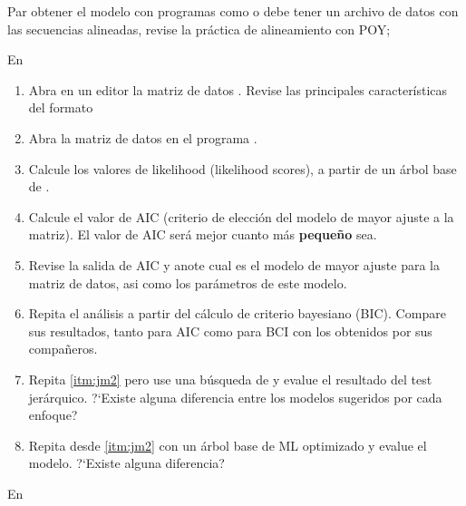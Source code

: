 Par obtener el modelo con programas como  o  debe tener un archivo de datos con las secuencias alineadas, revise la pr\'actica de alineamiento con POY; %



En 


\begin{enumerate}
	\item Abra en un editor la matriz de datos . Revise las principales caracter\'isticas del formato 

	\item Abra la matriz de datos en el programa .
	
	\item\label{itm:jm2} Calcule los valores de likelihood (likelihood scores), a partir de un \'arbol base de . 
	
	\item Calcule el valor de AIC (criterio de elecci\'on del modelo de mayor ajuste a la matriz). El valor de AIC ser\'a mejor cuanto m\'as \textbf{peque\~no} sea.
	
	\item Revise la salida de AIC y anote cual es el modelo de mayor ajuste para la matriz de datos, asi como los par\'ametros de este modelo.
	
	\item Repita el an\'alisis a partir del c\'alculo de criterio bayesiano (BIC). Compare sus resultados, tanto para AIC como para BCI con los obtenidos por sus compa\~neros.

	\item Repita \ref{itm:jm2}  pero use una b\'usqueda de  y evalue el resultado del test jer\'arquico. ?`Existe alguna diferencia entre los modelos sugeridos por cada enfoque? 

	\item Repita desde \ref{itm:jm2} con un \'arbol base de ML optimizado y evalue el modelo. ?`Existe alguna diferencia?
\end{enumerate}



En 


